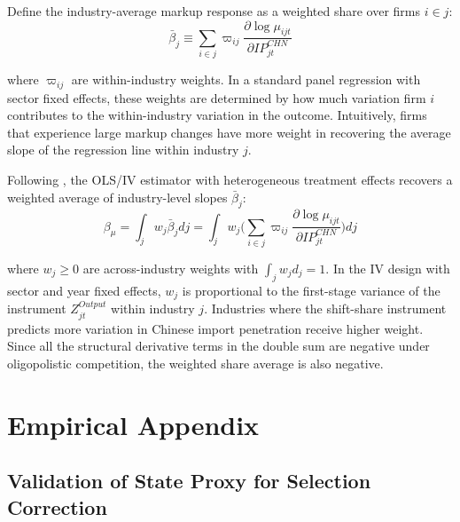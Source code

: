 \documentclass[12pt]{article}
\begin{document}
Define the industry-average markup response as a weighted share over firms $i \in j$:
\[
\bar{\beta}_j \equiv \sum_{i \in j} \varpi_{ij} \frac{\partial \log \mu_{ijt}}{\partial IP_{jt}^{CHN}}
\]

where $\varpi_{ij}$ are within-industry weights. In a standard panel regression with sector fixed effects, these weights are determined by how much variation firm $i$ contributes to the within-industry variation in the outcome. Intuitively, firms that experience large markup changes have more weight in recovering the average slope of the regression line within industry $j$.

Following \textcite{EmpiricalStrategiesLabor1999}, the OLS/IV estimator with heterogeneous treatment effects recovers a weighted average of industry-level slopes $\bar{\beta}_j$: 
\[
\beta_{\mu} = \int_j w_j \bar{\beta}_j dj = \int_j w_j \bigg(\sum_{i \in j} \varpi_{ij} \frac{\partial \log \mu_{ijt}}{\partial IP_{jt}^{CHN}} \bigg)dj
\]

where $w_j \geq 0$ are across-industry weights with $\int_j w_j d_j = 1$. In the IV design with sector and year fixed effects, $w_j$ is proportional to the first-stage variance of the instrument $Z^{Output}_{jt}$ within industry $j$. Industries where the shift-share instrument predicts more variation in Chinese import penetration receive higher weight. Since all the structural derivative terms in the double sum are negative under oligopolistic competition, the weighted share average is also negative. 

\section{Empirical Appendix}

\subsection{Validation of State Proxy for Selection Correction}
\end{document}
